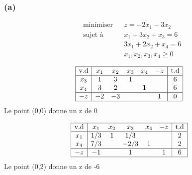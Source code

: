 \documentclass{article}
\begin{document}
\subsubsection*{(a)}

\begin{equation*}
   \begin{aligned}
      & \underset{}{\text{minimiser}}
      & & z = -2x_1 - 3x_2 \\
      & \text{sujet à}
      & & x_1 + 3x_2 + x_3 = 6 \\
        &   &   & 3x_1 + 2x_2 + x_4 = 6    \\
        &   &   & x_1, x_2 , x_3,x_4 \ge 0 
   \end{aligned}
\end{equation*}

\begin{center}
   \begin{equation*}
      \begin{array}{|c|ccccc|c|}
         \hline
         \text{v.d} & x_1 & x_2 & x_3 & x_4 & -z & \text{t.d} \\ \hline
         x_3        & 1   & 3   & 1   &     &    & 6          \\ 
         x_4        & 3   & 2   &     & 1   &    & 6          \\ \hline 
         -z         & -2  & -3  &     &     & 1  & 0          \\ \hline
      \end{array}
   \end{equation*}
   Le point (0,0) donne un z de 0
   
   \begin{equation*}
      \begin{array}{|c|ccccc|c|}
         \hline
         \text{v.d} & x_1 & x_2 & x_3  & x_4 & -z & \text{t.d} \\ \hline
         x_1        & 1/3 & 1   & 1/3  &     &    & 2          \\ 
         x_4        & 7/3 &     & -2/3 & 1   &    & 2          \\ \hline 
         -z         & -1  &     & 1    &     & 1  & 6          \\ \hline
      \end{array}
   \end{equation*}
   Le point (0,2) donne un z de -6
      

\end{center}
\end{document}
